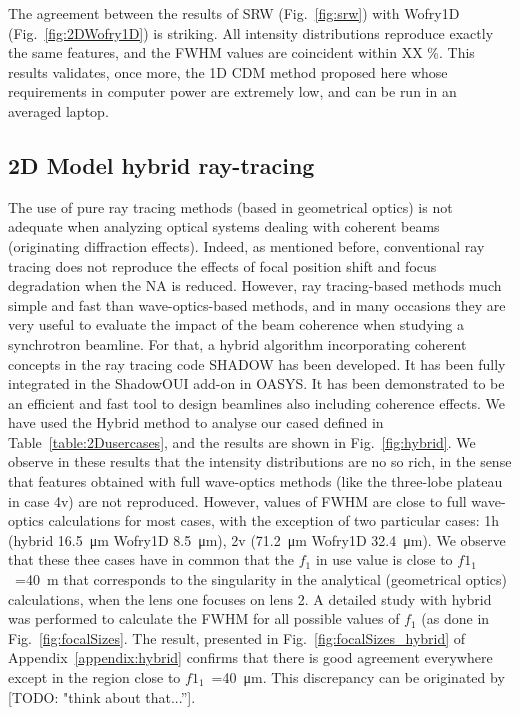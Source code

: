 \documentclass{iucr}              %
\newcommand{\todo}[1]{{\color{red}[TODO: "#1'']}}
\newcommand{\inred}[1]{{\color{red}#1}}
\begin{document}
The agreement between the results of SRW (Fig.~\ref{fig:srw}) with Wofry1D (Fig.~\ref{fig:2DWofry1D}) is striking. All intensity distributions reproduce exactly the same features, and the FWHM values are coincident within \inred{XX \%}. This results validates, once more, the 1D CDM method proposed here whose requirements in computer power are extremely low, and can be run in an averaged laptop.  

\subsection{2D Model hybrid ray-tracing}
The use of pure ray tracing methods (based in geometrical optics) is not adequate when analyzing optical systems dealing with coherent beams (originating diffraction effects). Indeed, as mentioned before, conventional ray tracing does not reproduce the effects of focal position shift and focus degradation when the NA is reduced. However, ray tracing-based methods much simple and fast than wave-optics-based methods, and in many occasions they are very useful to evaluate the impact of the beam coherence when studying a synchrotron beamline. For that, a hybrid  \cite{codeHYBRID} algorithm incorporating coherent concepts in the ray tracing code SHADOW \cite{codeSHADOW} has been developed. It has been fully   integrated in the ShadowOUI \cite{codeSHADOWOUI} add-on in OASYS. It has been demonstrated to be an efficient and fast tool to design beamlines also including coherence effects. We have used the Hybrid method to analyse our cased defined in Table~\ref{table:2Dusercases}, and the results are shown in Fig.~\ref{fig:hybrid}.  We observe in these results that the intensity distributions are no so rich, in the sense that  features obtained with full wave-optics methods (like the three-lobe plateau in case 4v) are not reproduced. However, values of FWHM are close to full wave-optics calculations for most cases, with the exception of two particular cases:
1h (hybrid \SI{16.5}{\micro\meter} Wofry1D \SI{8.5}{\micro\meter}),
2v (\SI{71.2}{\micro\meter} Wofry1D \SI{32.4}{\micro\meter}). 
We observe that these thee cases have in common that the $f_1$ in use value is close to $f1_1$~=\SI{40}{\meter} that corresponds to the singularity in the analytical (geometrical optics) calculations, when the lens one focuses on lens 2. A detailed study with hybrid was performed to calculate the FWHM for all possible values of $f_1$ (as done in Fig.~\ref{fig:focalSizes}. The result, presented in Fig.~\ref{fig:focalSizes_hybrid} of Appendix~\ref{appendix:hybrid} confirms that there is good agreement everywhere except in the region close to $f1_1$~=\SI{40}{\micro\meter}. This discrepancy can be originated by \todo{think about that...}.
\end{document}

